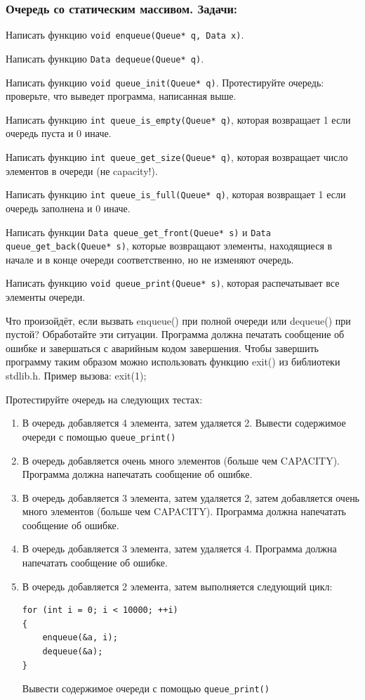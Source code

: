 \documentclass{article}
\newenvironment{modenumerate}
  {\enumerate\setupmodenumerate}
  {\endenumerate}
\newif\ifmoditem
\newcommand{\setupmodenumerate}{%
  \global\moditemfalse
  \let\origmakelabel\makelabel
  \def\moditem##1{\global\moditemtrue\def\mesymbol{##1}\item}%
  \def\makelabel##1{%
    \origmakelabel{##1\ifmoditem\rlap{\mesymbol}\fi\enspace}%
    \global\moditemfalse}%
}
\begin{document}
\subsubsection*{Очередь со статическим массивом. Задачи:}
\begin{modenumerate}
\item Написать функцию \texttt{void enqueue(Queue* q, Data x)}.
\item Написать функцию \texttt{Data dequeue(Queue* q)}.
\item Написать функцию \texttt{void queue\_init(Queue* q)}.
 Протестируйте очередь: проверьте, что выведет программа, написанная выше.
\item Написать функцию \texttt{int queue\_is\_empty(Queue* q)}, которая возвращает 1 если очередь пуста и 0 иначе.
\item Написать функцию \texttt{int queue\_get\_size(Queue* q)}, которая возвращает число элементов в очереди (не capacity!).
\item Написать функцию \texttt{int queue\_is\_full(Queue* q)}, которая возвращает 1 если очередь заполнена и 0 иначе.
\item Написать функции \texttt{Data queue\_get\_front(Queue* s)} и \texttt{Data queue\_get\_back(Queue* s)}, которые возвращают элементы, находящиеся в начале и в конце очереди соответственно, но не изменяют очередь.
\item Написать функцию \texttt{void queue\_print(Queue* s)}, которая распечатывает все элементы очереди.
\item Что произойдёт, если вызвать enqueue() при полной очереди или dequeue() при пустой? Обработайте эти ситуации. Программа должна печатать сообщение об ошибке и завершаться с аварийным кодом завершения. Чтобы завершить программу таким образом можно использовать функцию exit() из библиотеки stdlib.h. Пример вызова: exit(1);

\item Протестируйте очередь на следующих тестах:
\begin{enumerate}
\item В очередь добавляется 4 элемента, затем удаляется 2. Вывести содержимое очереди с помощью \texttt{queue\_print()}
\item В очередь добавляется очень много элементов (больше чем CAPACITY). Программа должна напечатать сообщение об ошибке.
\item В очередь добавляется 3 элемента, затем удаляется 2, затем добавляется очень много элементов (больше чем CAPACITY). Программа должна напечатать сообщение об ошибке.
\item В очередь добавляется 3 элемента, затем удаляется 4. Программа должна напечатать сообщение об ошибке.
\item В очередь добавляется 2 элемента, затем выполняется следующий цикл:
\begin{verbatim}
for (int i = 0; i < 10000; ++i)
{
    enqueue(&a, i);
    dequeue(&a);
}
\end{verbatim}
Вывести содержимое очереди с помощью \texttt{queue\_print()}
\end{enumerate}


\end{modenumerate}
\end{document}
